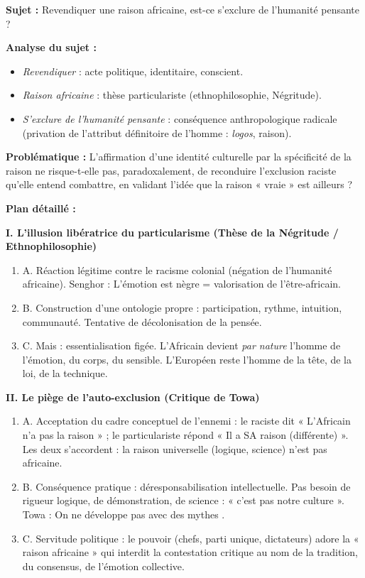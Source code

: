 \documentclass[11pt]{article}
\begin{document}
\begin{exoresolu}
\textbf{Sujet :} \guillemotleft Revendiquer une raison africaine, est-ce s'exclure de l'humanité pensante ? \guillemotright

\textbf{Analyse du sujet :}
\begin{itemize}
\item \emph{Revendiquer} : acte politique, identitaire, conscient.
\item \emph{Raison africaine} : thèse particulariste (ethnophilosophie, Négritude).
\item \emph{S'exclure de l'humanité pensante} : conséquence anthropologique radicale (privation de l'attribut définitoire de l'homme : \emph{logos}, raison).
\end{itemize}

\textbf{Problématique :} L'affirmation d'une identité culturelle par la spécificité de la raison ne risque-t-elle pas, paradoxalement, de reconduire l'exclusion raciste qu'elle entend combattre, en validant l'idée que la raison « vraie » est ailleurs ?

\textbf{Plan détaillé :}

\textbf{I. L'illusion libératrice du particularisme (Thèse de la Négritude / Ethnophilosophie)}
\begin{enumerate}
\item A. Réaction légitime contre le racisme colonial (négation de l'humanité africaine). Senghor : \guillemotleft L'émotion est nègre \guillemotright = valorisation de l'être-africain.
\item B. Construction d'une ontologie propre : participation, rythme, intuition, communauté. Tentative de décolonisation de la pensée.
\item C. Mais : essentialisation figée. L'Africain devient \emph{par nature} l'homme de l'émotion, du corps, du sensible. L'Européen reste l'homme de la tête, de la loi, de la technique.
\end{enumerate}

\textbf{II. Le piège de l'auto-exclusion (Critique de Towa)}
\begin{enumerate}
\item A. Acceptation du cadre conceptuel de l'ennemi : le raciste dit « L'Africain n'a pas la raison » ; le particulariste répond « Il a SA raison (différente) ». Les deux s'accordent : la raison universelle (logique, science) n'est pas africaine.
\item B. Conséquence pratique : déresponsabilisation intellectuelle. Pas besoin de rigueur logique, de démonstration, de science : « c'est pas notre culture ». Towa : \guillemotleft On ne développe pas avec des mythes \guillemotright.
\item C. Servitude politique : le pouvoir (chefs, parti unique, dictateurs) adore la « raison africaine » qui interdit la contestation critique au nom de la tradition, du consensus, de l'émotion collective.
\end{enumerate}


\end{exoresolu}
\end{document}
